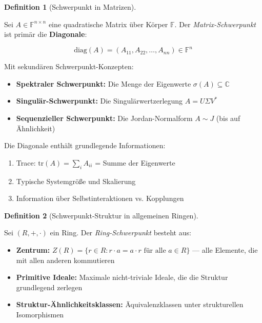 \documentclass[a4paper,12pt]{article}
\theoremstyle{definition}
\newtheorem{definition}{Definition}
\begin{document}
\begin{definition}[Schwerpunkt in Matrizen]
\label{def:schwerpunkt_matrix}

Sei $A \in \mathbb{F}^{n \times n}$ eine quadratische Matrix über Körper $\mathbb{F}$. Der \emph{Matrix-Schwerpunkt} ist primär die \textbf{Diagonale}:

\[
\text{diag}(A) = (A_{11}, A_{22}, \ldots, A_{nn}) \in \mathbb{F}^n
\]

Mit sekundären Schwerpunkt-Konzepten:

\begin{itemize}
\item \textbf{Spektraler Schwerpunkt:} Die Menge der Eigenwerte $\sigma(A) \subseteq \mathbb{C}$
\item \textbf{Singulär-Schwerpunkt:} Die Singulärwertzerlegung $A = U \Sigma V^*$
\item \textbf{Sequenzieller Schwerpunkt:} Die Jordan-Normalform $A \sim J$ (bis auf Ähnlichkeit)
\end{itemize}

Die Diagonale enthält grundlegende Informationen:
\begin{enumerate}
\item Trace: $\text{tr}(A) = \sum_i A_{ii}$ = Summe der Eigenwerte
\item Typische Systemgröße und Skalierung
\item Information über Selbstinteraktionen vs. Kopplungen
\end{enumerate}
\end{definition}

\begin{definition}[Schwerpunkt-Struktur in allgemeinen Ringen]
\label{def:schwerpunkt_ring}

Sei $(R, +, \cdot)$ ein Ring. Der \emph{Ring-Schwerpunkt} besteht aus:

\begin{itemize}
\item \textbf{Zentrum:} $Z(R) = \{r \in R : r \cdot a = a \cdot r \text{ für alle } a \in R\}$ --- alle Elemente, die mit allen anderen kommutieren

\item \textbf{Primitive Ideale:} Maximale nicht-triviale Ideale, die die Struktur grundlegend zerlegen

\item \textbf{Struktur-Ähnlichkeitsklassen:} Äquivalenzklassen unter strukturellen Isomorphismen
\end{itemize}
\end{definition}
\end{document}

